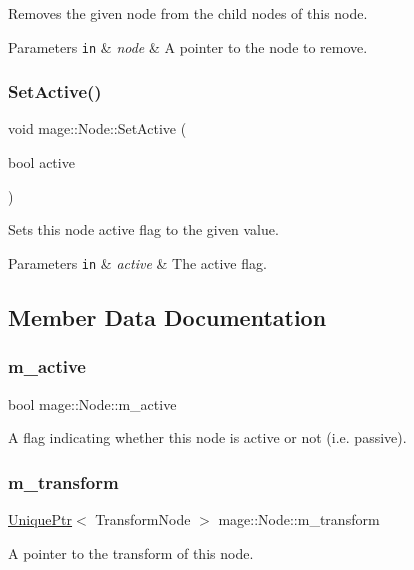 Removes the given node from the child nodes of this node.


\begin{DoxyParams}[1]{Parameters}
\mbox{\tt in}  & {\em node} & A pointer to the node to remove. \\
\hline
\end{DoxyParams}
\hypertarget{classmage_1_1_node_af123050daa89e50f5468b630061aae53}{}\label{classmage_1_1_node_af123050daa89e50f5468b630061aae53} 
\subsubsection{\texorpdfstring{Set\+Active()}{SetActive()}}
{\footnotesize\ttfamily void mage\+::\+Node\+::\+Set\+Active (\begin{DoxyParamCaption}\item[{bool}]{active }\end{DoxyParamCaption})\hspace{0.3cm}{\ttfamily [noexcept]}}

Sets this node active flag to the given value.


\begin{DoxyParams}[1]{Parameters}
\mbox{\tt in}  & {\em active} & The active flag. \\
\hline
\end{DoxyParams}


\subsection{Member Data Documentation}
\hypertarget{classmage_1_1_node_ac4dd6c399de8b2a92df92365df7ecdac}{}\label{classmage_1_1_node_ac4dd6c399de8b2a92df92365df7ecdac} 
\subsubsection{\texorpdfstring{m\+\_\+active}{m\_active}}
{\footnotesize\ttfamily bool mage\+::\+Node\+::m\+\_\+active\hspace{0.3cm}{\ttfamily [private]}}

A flag indicating whether this node is active or not (i.\+e. passive). \hypertarget{classmage_1_1_node_a24512023f5f6ec7adad9810e55ec2ab5}{}\label{classmage_1_1_node_a24512023f5f6ec7adad9810e55ec2ab5} 
\subsubsection{\texorpdfstring{m\+\_\+transform}{m\_transform}}
{\footnotesize\ttfamily \hyperlink{namespacemage_a8c307fbcc33bce9b7f2aa4c26c3b95cf}{Unique\+Ptr}$<$ Transform\+Node $>$ mage\+::\+Node\+::m\+\_\+transform\hspace{0.3cm}{\ttfamily [private]}}

A pointer to the transform of this node. 